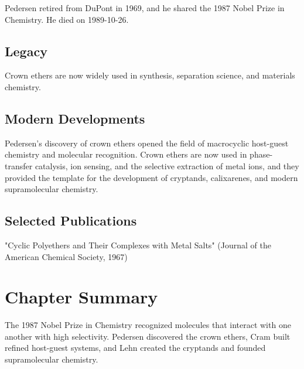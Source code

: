 Pedersen retired from DuPont in 1969, and he shared the 1987 Nobel Prize in Chemistry. He died on 1989-10-26.

\subsection*{Legacy}

Crown ethers are now widely used in synthesis, separation science, and materials chemistry.

\subsection*{Modern Developments}

Pedersen's discovery of crown ethers opened the field of macrocyclic host-guest chemistry and molecular recognition. Crown ethers are now used in phase-transfer catalysis, ion sensing, and the selective extraction of metal ions, and they provided the template for the development of cryptands, calixarenes, and modern supramolecular chemistry.

\subsection*{Selected Publications}

"Cyclic Polyethers and Their Complexes with Metal Salts" (Journal of the American Chemical Society, 1967)

\clearpage

\section*{Chapter Summary}

The 1987 Nobel Prize in Chemistry recognized molecules that interact with one another with high selectivity. Pedersen discovered the crown ethers, Cram built refined host-guest systems, and Lehn created the cryptands and founded supramolecular chemistry.
